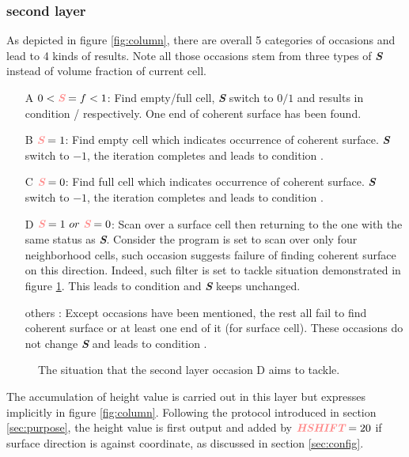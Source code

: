 \documentclass[a4paper]{article}
\newcommand{\para}[1]{\textbf{\emph{\textcolor{para}{#1}}}}
\begin{document}
\subsubsection{second layer}
As depicted in figure \ref{fig:column}, there are overall 5 categories of occasions and lead to 4 kinds of results. Note all those occasions stem from three types of \para{S} instead of volume fraction of current cell.
\begin{itemize}
    \item[A] $0<\para{S}=f<1$: Find empty/full cell, \para{S} switch to $0/1$ and results in condition / respectively. One end of coherent surface has been found.
    \item[B] $\para{S}=1$: Find empty cell which indicates occurrence of coherent surface. \para{S} switch to $-1$, the iteration completes and leads to condition .
    \item[C] $\para{S}=0$: Find full cell which indicates occurrence of coherent surface. \para{S} switch to $-1$, the iteration completes and leads to condition .
    \item[D] $\para{S}=1\ or\ \para{S}=0$: Scan over a surface cell then returning to the one with the same status as \para{S}. Consider the program is set to scan over only four neighborhood cells, such occasion suggests failure of finding coherent surface on this direction. Indeed, such filter is set to tackle situation demonstrated in figure \ref{fig:Dtarget}. This leads to condition  and \para{S} keeps unchanged.
    \item[others]: Except occasions have been mentioned, the rest all fail to find coherent surface or at least one end of it (for surface cell). These occasions do not change \para{S} and leads to condition .
\end{itemize}
\begin{figure}
    \centering
    \caption{The situation that the second layer occasion D aims to tackle.}
    \label{fig:Dtarget}
\end{figure}
The accumulation of height value is carried out in this layer but expresses implicitly in figure \ref{fig:column}. Following the protocol introduced in section \ref{sec:purpose}, the height value is first output and added by $\para{HSHIFT}=20$ if surface direction is against coordinate, as discussed in section \ref{sec:config}.
\end{document}
